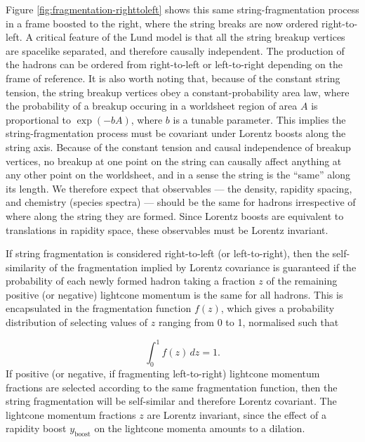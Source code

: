 \documentclass[12pt,a4paper]{report}
\begin{document}
Figure \ref{fig:fragmentation-righttoleft} shows this same string-fragmentation process in a frame boosted to the right, where the string breaks are now ordered right-to-left. A critical feature of the Lund model is that all the string breakup vertices are spacelike separated, and therefore causally independent. The production of the hadrons can be ordered from right-to-left or left-to-right depending on the frame of reference. It is also worth noting that, because of the constant string tension, the string breakup vertices obey a constant-probability area law, where the probability of a breakup occuring in a worldsheet region of area $A$ is proportional to $\exp(-bA)$, where $b$ is a tunable parameter. This implies the string-fragmentation process must be covariant under Lorentz boosts along the string axis. Because of the constant tension and causal independence of breakup vertices, no breakup at one point on the string can causally affect anything at any other point on the worldsheet, and in a sense the string is the ``same'' along its length. We therefore expect that observables --- the density, rapidity spacing, and chemistry (species spectra) --- should be the same for hadrons irrespective of where along the string they are formed. Since Lorentz boosts are equivalent to translations in rapidity space, these observables must be Lorentz invariant.

\begin{sloppypar} If string fragmentation is considered right-to-left (or left-to-right), then the self-similarity of the fragmentation implied by Lorentz covariance is guaranteed if the probability of each newly formed hadron taking a fraction $z$ of the remaining positive (or negative) lightcone momentum is the same for all hadrons. This is encapsulated in the fragmentation function $f(z)$, which gives a probability distribution of selecting values of $z$ ranging from 0 to 1, normalised such that\end{sloppypar}
\begin{equation}\label{eq:fragmentation-norm}
  \int_0^1 f(z) \, dz = 1.
\end{equation}
If positive (or negative, if fragmenting left-to-right) lightcone momentum fractions are selected according to the same fragmentation function, then the string fragmentation will be self-similar and therefore Lorentz covariant. The lightcone momentum fractions $z$ are Lorentz invariant, since the effect of a rapidity boost $y_\text{boost}$ on the lightcone momenta amounts to a dilation.
\end{document}
